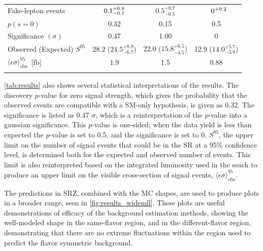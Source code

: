 \begin{table}
\begin{center}
\begin{tabular*}{\textwidth}{@{\extracolsep{\fill}}lccc}
 Fake-lepton events                                                         & $\makebox[3ex]{\hfill 0.1}_{-0.1}^{+0.8}$   & $0.5_{-0.5}^{+0.7}$ &   $\makebox[3ex]{\hfill 0}^{+0.2}$    \\
 \noalign{\smallskip}\hline\noalign{\smallskip}
$p(s=0)$                                                                    & 0.32      & 0.15        & 0.5        \\
Significance $(\sigma)$                                                               & 0.47                     & 1.00                   & 0           \\
Observed (Expected) $S^{95}$                                                & 28.2 ($24.5_{-6.7}^{+8.9}$) & 22.0 ($15.8_{-4.5}^{+6.5}$) & 12.9 ($14.0_{-3.9}^{+5.7}$) \\
$\langle\epsilon\sigma\rangle^{95}_\text{obs}$~[fb]                         & 1.9             & 1.5                    & 0.88   \\
 \noalign{\smallskip}\hline\noalign{\smallskip}
\end{tabular*}
\end{center}
\label{tab:results}
\end{table}

\autoref{tab:results} also shows several statistical interpretations of the results. The discovery $p$-value for zero signal strength, which gives the probability that the observed events are compatible with a \ac{SM}-only hypothesis, is given as 0.32. The significance is listed as 0.47 $\sigma$, which is a reinterpretation of the $p$-value into a gaussian significance. This $p$-value is one-sided; when the data yield is less than expected the $p$-value is set to 0.5, and the significance is set to 0. $S^{95}$, the upper limit on the number of signal events that could be in the \ac{SR} at a 95\% confidence level, is determined both for the expected and observed number of events. This limit is also reinterpreted based on the integrated luminosity used in the seach to produce an upper limit on the visible cross-section of signal events, $\langle\epsilon\sigma\rangle^{95}_\text{obs}$.

The predictions in SRZ, combined with the \ac{MC} shapes, are used to produce plots in a broader \mll range, seen in \autoref{fig:results_widemll}. These plots are useful demonstrations of efficacy of the background estimation methods, showing the well-modeled \dyjets shape in the same-flavor region, and in the different-flavor region, demonstrating that there are no extreme fluctuations within the region used to predict the flavor symmetric background.

